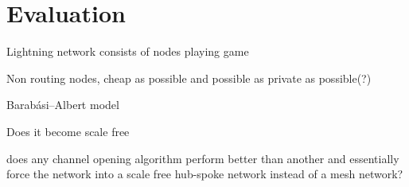 \section{Evaluation}

Lightning network consists of nodes playing game

Non routing nodes, cheap as possible and possible as private as possible(?) 

Barabási–Albert model

Does it become scale free

does any channel opening algorithm perform better than another and essentially force the network into a scale free hub-spoke network instead of a mesh network?





